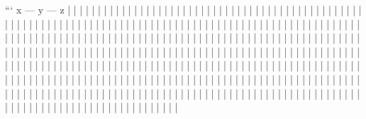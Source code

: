 ```
x --- y --- z
|         |
|         |
|         |
|         |
|         |
|         |
|         |
|         |
|         |
|         |
|         |
|         |
|         |
|         |
|         |
|         |
|         |
|         |
|         |
|         |
|         |
|         |
|         |
|         |
|         |
|         |
|         |
|         |
|         |
|         |
|         |
|         |
|         |
|         |
|         |
|         |
|         |
|         |
|         |
|         |
|         |
|         |
|         |
|         |
|         |
|         |
|         |
|         |
|         |
|         |
|         |
|         |
|         |
|         |
|         |
|         |
|         |
|         |
|         |
|         |
|         |
|         |
|         |
|         |
|         |
|         |
|         |
|         |
|         |
|         |
|         |
|         |
|         |
|         |
|         |
|         |
|         |
|         |
|         |
|         |
|         |
|         |
|         |
|         |
|         |
|         |
|         |
|         |
|         |
|         |
|         |
|         |
|         |
|         |
|         |
|         |
|         |
|         |
|         |
|         |
|         |
|         |
|         |
|         |
|         |
|         |
|         |
|         |
|         |
|         |
|         |
|         |
|         |
|         |
|         |
|         |
|         |
|         |
|         |
|         |
|         |
|         |
|         |
|         |
|         |
|         |
|         |
|         |
|         |
|         |
|         |
|         |
|         |
|         |
|         |
|         |
|         |
|         |
|         |
|         |
|         |
|         |
|         |
|         |
|         |
|         |
|         |
|         |
|         |
|         |
|         |
|         |
|         |
|         |
|         |
|         |
|         |
|         |
|         |
|         |
|         |
|         |
|         |
|         |
|         |
|         |
|         |
|         |
|         |
|         |
|         |
|         |
|         |
|         |
|         |
|         |
|         |
|         |
|         |
|         |
|         |
|         |
|         |
|         |
|         |
|         |
|         |
|         |
|         |
|         |
|         |
|         |
|         |
|         |
|         |
|         |
|         |
|         |
|         |
|         |
|         |
|         |
|         |
|         |
|         |
|         |
|         |
|         |
|         |
|         |
|         |
|         |
|         |
|         |
|         |
|         |
